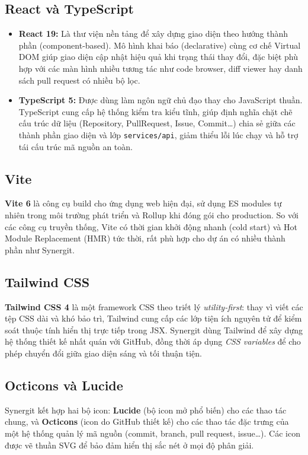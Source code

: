 \subsection{React và TypeScript}
\begin{itemize}
\item \textbf{React 19:} Là thư viện nền tảng để xây dựng giao diện theo hướng thành phần (component-based). Mô hình khai báo (declarative) cùng cơ chế Virtual DOM giúp giao diện cập nhật hiệu quả khi trạng thái thay đổi, đặc biệt phù hợp với các màn hình nhiều tương tác như code browser, diff viewer hay danh sách pull request có nhiều bộ lọc.
\item \textbf{TypeScript 5:} Được dùng làm ngôn ngữ chủ đạo thay cho JavaScript thuần. TypeScript cung cấp hệ thống kiểm tra kiểu tĩnh, giúp định nghĩa chặt chẽ cấu trúc dữ liệu (Repository, PullRequest, Issue, Commit\ldots) chia sẻ giữa các thành phần giao diện và lớp \texttt{services/api}, giảm thiểu lỗi lúc chạy và hỗ trợ tái cấu trúc mã nguồn an toàn.
\end{itemize}

\subsection{Vite}
\textbf{Vite 6} là công cụ build cho ứng dụng web hiện đại, sử dụng ES modules tự nhiên trong môi trường phát triển và Rollup khi đóng gói cho production. So với các công cụ truyền thống, Vite có thời gian khởi động nhanh (cold start) và Hot Module Replacement (HMR) tức thời, rất phù hợp cho dự án có nhiều thành phần như Synergit.

\subsection{Tailwind CSS}
\textbf{Tailwind CSS 4} là một framework CSS theo triết lý \textit{utility-first}: thay vì viết các tệp CSS dài và khó bảo trì, Tailwind cung cấp các lớp tiện ích nguyên tử để kiểm soát thuộc tính hiển thị trực tiếp trong JSX. Synergit dùng Tailwind để xây dựng hệ thống thiết kế nhất quán với GitHub, đồng thời áp dụng \textit{CSS variables} để cho phép chuyển đổi giữa giao diện sáng và tối thuận tiện.

\subsection{Octicons và Lucide}
Synergit kết hợp hai bộ icon: \textbf{Lucide} (bộ icon mở phổ biến) cho các thao tác chung, và \textbf{Octicons} (icon do GitHub thiết kế) cho các thao tác đặc trưng của một hệ thống quản lý mã nguồn (commit, branch, pull request, issue\ldots). Các icon được vẽ thuần SVG để bảo đảm hiển thị sắc nét ở mọi độ phân giải.

